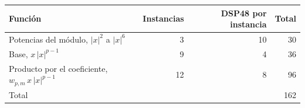 \begin{tabular}{lrrr}
\hline
Funci\'on & Instancias & DSP48 por instancia & Total \\
\hline
Potencias del m\'odulo, $|x|^2$ a $|x|^6$ & 3 & 10 & 30 \\
Base, $x\,|x|^{p-1}$ & 9 & 4 & 36 \\
Producto por el coeficiente, $w_{p,m}\,x\,|x|^{p-1}$ & 12 & 8 & 96 \\
\hline
Total & & & 162 \\
\hline
\end{tabular}
